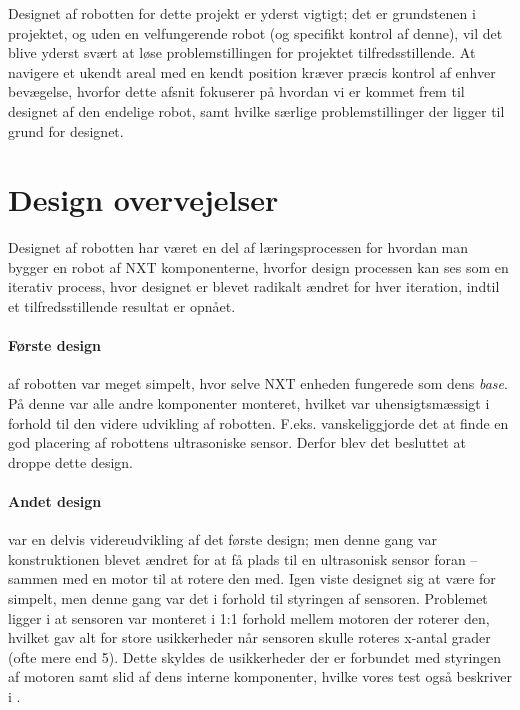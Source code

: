 Designet af robotten for dette projekt er yderst vigtigt; det er grundstenen i projektet, og uden en velfungerende robot (og specifikt kontrol af denne), vil det blive yderst svært at løse problemstillingen for projektet tilfredsstillende.
At navigere et ukendt areal med en kendt position kræver præcis kontrol af enhver bevægelse, hvorfor dette afsnit fokuserer på hvordan vi er kommet frem til designet af den endelige robot, samt hvilke særlige problemstillinger der ligger til grund for designet.

\section{Design overvejelser}\label{robot:design}
Designet af robotten har været en del af læringsprocessen for hvordan man bygger en robot af \lego NXT komponenterne, hvorfor design processen kan ses som en iterativ process, hvor designet er blevet radikalt ændret for hver iteration, indtil et tilfredsstillende resultat er opnået.



\paragraph{Første design} af robotten var meget simpelt, hvor selve NXT enheden fungerede som dens \textit{base}.
På denne var alle andre komponenter monteret, hvilket var uhensigtsmæssigt i forhold til den videre udvikling af robotten.
F.eks. vanskeliggjorde det at finde en god placering af robottens ultrasoniske sensor.
Derfor blev det besluttet at droppe dette design.

\paragraph{Andet design} var en delvis videreudvikling af det første design; men denne gang var konstruktionen blevet ændret for at få plads til en ultrasonisk sensor foran -- sammen med en motor til at rotere den med.
Igen viste designet sig at være for simpelt, men denne gang var det i forhold til styringen af sensoren.
Problemet ligger i at sensoren var monteret i 1:1 forhold mellem motoren der roterer den, hvilket gav alt for store usikkerheder når sensoren skulle roteres x-antal grader (ofte mere end 5\degree).
Dette skyldes de usikkerheder der er forbundet med styringen af motoren samt slid af dens interne komponenter, hvilke vores test også beskriver i .

